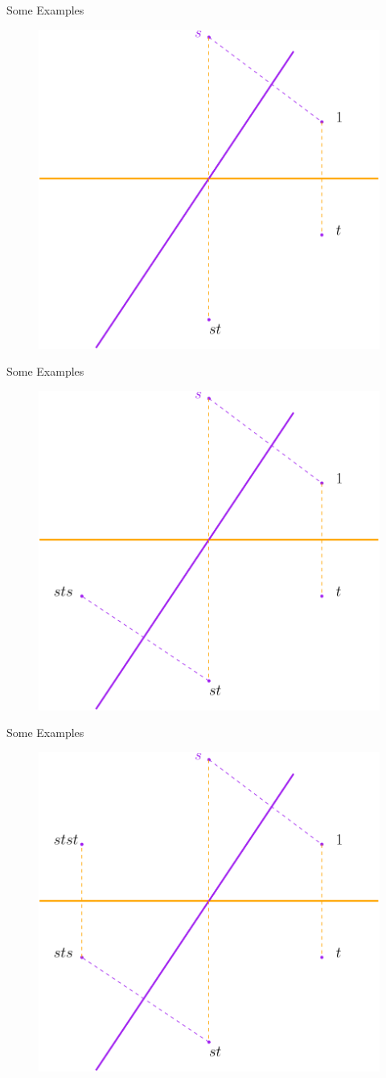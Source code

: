 \documentclass[aspectratio=169,xcolor=dvipsnames]{beamer}
\begin{document}
\begin{frame}{Some Examples}
    \begin{figure}
        \centering
        \includegraphics[width=0.5\linewidth]{frameN-3.png}
        \label{fig:enter-label}
    \end{figure}
\end{frame}

\begin{frame}{Some Examples}
\begin{figure}
    \centering
    \includegraphics[width=0.5\linewidth]{frameN-2.png}
    \label{fig:enter-label}
\end{figure}
\end{frame}

\begin{frame}{Some Examples}
    \begin{figure}
        \centering
        \includegraphics[width=0.5\linewidth]{frameN-1.png}
        \label{fig:enter-label}
    \end{figure}
\end{frame}
\end{document}

